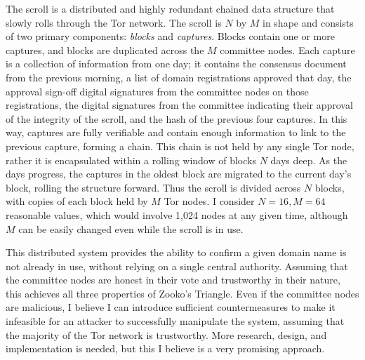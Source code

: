 \documentclass[journal]{IEEEtran}
\begin{document}
The scroll is a distributed and highly redundant chained data structure that slowly rolls through the Tor network. The scroll is $ N $ by $ M $ in shape and consists of two primary components: \textit{blocks} and \textit{captures}. Blocks contain one or more captures, and blocks are duplicated across the $ M $ committee nodes. Each capture is a collection of information from one day; it contains the consensus document from the previous morning, a list of domain registrations approved that day, the approval sign-off digital signatures from the committee nodes on those registrations, the digital signatures from the committee indicating their approval of the integrity of the scroll, and the hash of the previous four captures. In this way, captures are fully verifiable and contain enough information to link to the previous capture, forming a chain. This chain is not held by any single Tor node, rather it is encapsulated within a rolling window of blocks $ N $ days deep. As the days progress, the captures in the oldest block are migrated to the current day's block, rolling the structure forward. Thus the scroll is divided across $ N $ blocks, with copies of each block held by $ M $ Tor nodes. I consider $ N = 16, M = 64 $ reasonable values, which would involve 1,024 nodes at any given time, although $ M $ can be easily changed even while the scroll is in use.

This distributed system provides the ability to confirm a given domain name is not already in use, without relying on a single central authority. Assuming that the committee nodes are honest in their vote and trustworthy in their nature, this achieves all three properties of Zooko's Triangle. Even if the committee nodes are malicious, I believe I can introduce sufficient countermeasures to make it infeasible for an attacker to successfully manipulate the system, assuming that the majority of the Tor network is trustworthy. More research, design, and implementation is needed, but this I believe is a very promising approach.


\end{document}
